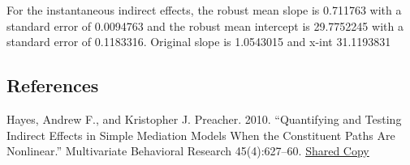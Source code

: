 \documentclass[
]{article}
\begin{document}
For the instantaneous indirect effects, the robust mean slope is
0.711763 with a standard error of 0.0094763 and the robust mean
intercept is 29.7752245 with a standard error of 0.1183316. Original
slope is 1.0543015 and x-int 31.1193831

\hypertarget{references}{%
\subsection{References}\label{references}}

Hayes, Andrew F., and Kristopher J. Preacher. 2010. ``Quantifying and
Testing Indirect Effects in Simple Mediation Models When the Constituent
Paths Are Nonlinear.'' Multivariate Behavioral Research 45(4):627--60.
\href{http://quantpsy.org/pubs/hayes_preacher_2010.pdf}{Shared Copy}
\end{document}
